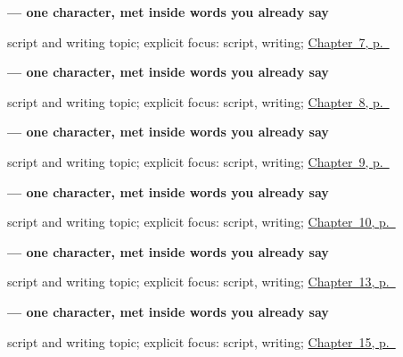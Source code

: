 \noindent\begin{minipage}[t]{\linewidth}
\raggedright
\textbf{ — one character, met inside words you already say}\par
\footnotesize script and writing topic; explicit focus: script, writing; \hyperref[ch:ka-numbers-one-to-ten]{Chapter~7, p.~\pageref*{ch:ka-numbers-one-to-ten}}
\end{minipage}\par\smallskip

\noindent\begin{minipage}[t]{\linewidth}
\raggedright
\textbf{ — one character, met inside words you already say}\par
\footnotesize script and writing topic; explicit focus: script, writing; \hyperref[ch:ka-please]{Chapter~8, p.~\pageref*{ch:ka-please}}
\end{minipage}\par\smallskip

\noindent\begin{minipage}[t]{\linewidth}
\raggedright
\textbf{ — one character, met inside words you already say}\par
\footnotesize script and writing topic; explicit focus: script, writing; \hyperref[ch:ka-sorry]{Chapter~9, p.~\pageref*{ch:ka-sorry}}
\end{minipage}\par\smallskip

\noindent\begin{minipage}[t]{\linewidth}
\raggedright
\textbf{ — one character, met inside words you already say}\par
\footnotesize script and writing topic; explicit focus: script, writing; \hyperref[ch:ka-days-of-the-week]{Chapter~10, p.~\pageref*{ch:ka-days-of-the-week}}
\end{minipage}\par\smallskip

\noindent\begin{minipage}[t]{\linewidth}
\raggedright
\textbf{ — one character, met inside words you already say}\par
\footnotesize script and writing topic; explicit focus: script, writing; \hyperref[ch:ka-head-and-hand]{Chapter~13, p.~\pageref*{ch:ka-head-and-hand}}
\end{minipage}\par\smallskip

\noindent\begin{minipage}[t]{\linewidth}
\raggedright
\textbf{ — one character, met inside words you already say}\par
\footnotesize script and writing topic; explicit focus: script, writing; \hyperref[ch:ka-water-and-rice]{Chapter~15, p.~\pageref*{ch:ka-water-and-rice}}
\end{minipage}\par\smallskip

